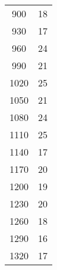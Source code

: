 \begin{table}[H]
\begin{tabular}{S S}
        900	& 18 \\
        930	& 17 \\
        960	& 24 \\
        990	& 21 \\
       1020 &	25  \\
       1050 &	21 \\
       1080 &	24 \\
       1110 &	25 \\
        1140 &	17 \\
        1170 &	20 \\
        1200 &	19 \\
        1230 &	20 \\
        1260 &	18 \\
        1290 &	16 \\
        1320 &	17 \\
      \bottomrule
    \end{tabular}
  \end{table}
